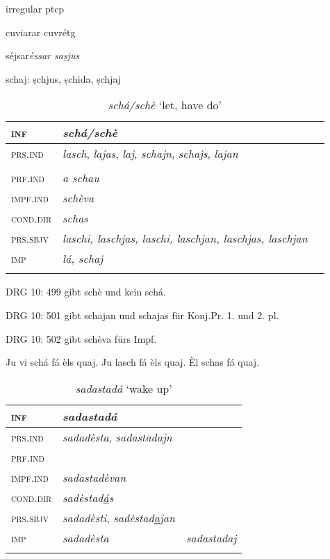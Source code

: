 irregular ptcp

cuviarar cuvrétg

séjsar\textit{èssar saṣjus} 

schaj: ṣchjus, ṣchida, ṣchjaj

\begin{table}
	\caption{\textit{schá/schè} `let, have do'}
	\label{}
	\begin{tabular}{lll}
		\lsptoprule
		\textsc{inf} & \textit{\textbf{schá/schè}}\\
		\midrule
		\textsc{prs.ind} & \textit{lasch}, \textit{lajas}, \textit{laj}, \textit{schajn}, \textit{schajs}, \textit{lajan}\\
		& \\
		\textsc{prf.ind} & \textit{a schau}\\
		\textsc{impf.ind} & \textit{schèva}\\
		\textsc{cond.dir} & \textit{schas}\\
		\textsc{prs.sbjv} 	& \textit{laschi, laschjas, laschi, laschjan, laschjas, laschjan}\\
		\textsc{imp}	& \textit{lá, schaj}\\
		\lspbottomrule
	\end{tabular}
\end{table}

DRG 10: 499 gibt schè und kein schá.

DRG 10: 501 gibt schajan und schajas für Konj.Pr. 1. und 2. pl.

DRG 10: 502 gibt schèva fürs Impf.

Ju vi schá fá èls quaj. Ju lasch fá èls quaj. Èl schas fá quaj.

\begin{table}
	\caption{\textit{\textit{sadastadá}} `wake up'}
	\label{}
	\begin{tabular}{lll}
		\lsptoprule
		\textsc{inf} & \textit{\textbf{sadastadá}}\\
		\midrule
		\textsc{prs.ind} & \textit{sadadèsta}, \textit{sadastadajn} \\
		\textsc{prf.ind} & \\
		\textsc{impf.ind} & \textit{sadastadèvan}\\
		\textsc{cond.dir} & \textit{sadèstad\underline{á}s}\\
		\textsc{prs.sbjv} & \textit{sadadèsti}, \textit{sadèstad\underline{a}jan}\\
		\textsc{imp} & \textit{sadadèsta} & \textit{sadastadaj}\\
		\lspbottomrule
	\end{tabular}
\end{table}


